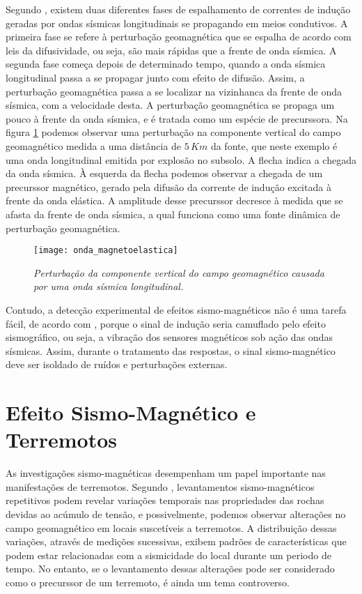 Segundo \cite{surkov_89b}, existem duas diferentes fases de espalhamento de correntes de indu\c{c}\~ao geradas por ondas s\'ismicas longitudinais se propagando em meios condutivos. A primeira fase se refere \`a perturba\c{c}\~ao geomagn\'etica que se espalha de acordo com leis da difusividade, ou seja, s\~ao mais r\'apidas que a frente de onda s\'ismica. A segunda fase come\c{c}a depois de determinado tempo, quando a onda s\'ismica longitudinal passa a se propagar junto com efeito de difus\~ao. Assim, a perturba\c{c}\~ao geomagn\'etica passa a se localizar na vizinhanca da frente de onda s\'ismica, com a velocidade desta. A perturba\c{c}\~ao geomagn\'etica se propaga um pouco \`a frente da onda s\'ismica, e \'e tratada como um esp\'ecie de precurssora. Na figura \ref{fig.onda_magnetoelastica} podemos observar uma perturba\c{c}\~ao na componente vertical do campo geomagn\'etico medida a uma dist\^ancia de $5\,Km$ da fonte, que neste exemplo \'e uma onda longitudinal emitida por explos\~ao no subsolo. A flecha indica a chegada da onda s\'ismica. \`A esquerda da flecha podemos observar a chegada de um precurssor magn\'etico, gerado pela difus\~ao da corrente de indu\c{c}\~ao excitada \`a frente da onda el\'astica. A amplitude desse precurssor decresce \`a medida que se afasta da frente de onda s\'ismica, a qual funciona como uma fonte din\^amica de perturba\c{c}\~ao geomagn\'etica.
\begin{figure}
\centering
\texttt{[image: onda\_magnetoelastica]}
\caption{\textit{Perturba\c{c}\~ao da componente vertical do campo geomagn\'etico causada por uma onda s\'ismica longitudinal.}}
\label{fig.onda_magnetoelastica}
\end{figure}
Contudo, a detec\c{c}\~ao experimental de efeitos sismo-magn\'eticos n\~ao \'e uma tarefa f\'acil, de acordo com \cite{surkov_97}, porque o sinal de indu\c{c}\~ao seria camuflado pelo efeito sismogr\'afico, ou seja, a vibra\c{c}\~ao dos sensores magn\'eticos sob a\c{c}\~ao das ondas s\'ismicas. Assim, durante o tratamento das respostas, o sinal sismo-magn\'etico deve ser isoldado de ru\'idos e perturba\c{c}\~oes externas.

\section{Efeito Sismo-Magn\'etico e Terremotos}

As investiga\c{c}\~oes sismo-magn\'eticas desempenham um papel importante nas manifesta\c{c}\~oes de terremotos. Segundo \cite{Cukavac_2008}, levantamentos sismo-magn\'eticos repetitivos podem revelar varia\c{c}\~oes temporais nas propriedades das rochas devidas ao ac\'umulo de tens\~ao, e possivelmente, podemos observar altera\c{c}\~oes no campo geomagn\'etico em locais suscet\'iveis a terremotos. A distribui\c{c}\~ao dessas varia\c{c}\~oes, atrav\'es de medi\c{c}\~oes sucessivas, exibem padr\~oes de caracter\'isticas que podem estar relacionadas com a sismicidade do local durante um periodo de tempo. No entanto, se o levantamento dessas altera\c{c}\~oes pode ser considerado como o precurssor de um terremoto, \'e ainda um tema controverso.

